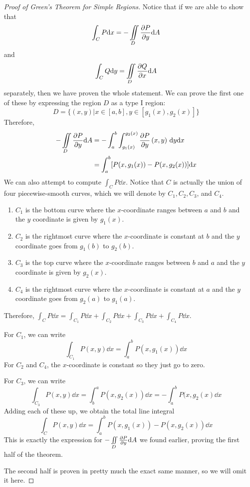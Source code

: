 \begin{proof}[Proof of Green's Theorem for Simple Regions]
    Notice that if we are able to show that
    \[ \int_C P \dd x = -\iint\limits_D \pdv{P}{y}\dd A\]
    and 
    \[ \int_C Q\dd y = \iint\limits_D \pdv{Q}{x}\dd A\]
    separately, then we have proven the whole statement. We can prove the first one of these by expressing the region $D$ as a type I region:
    \[ D = \{(x,y)|x\in[a,b], y\in[g_1(x),g_2(x)]\}\]
    Therefore,
    \begin{align*}
        -\iint\limits_D \pdv{P}{y}\dd A &= -\int_a^b\int_{g_1(x)}^{g_2(x)}\pdv{P}{y}\left(x,y\right)\,\dd y\dd x \\
        &= \int_a^b [P(x, g_1(x)) - P(x, g_2(x))]\dd x
    \end{align*}
    We can also attempt to compute $\int_CP\dd x$. Notice that $C$ is actually the union of four piecewise-smooth curves, which we will denote by $C_1, C_2, C_3$, and $C_4$.
    \begin{enumerate}
        \item $C_1$ is the bottom curve where the $x$-coordinate ranges between $a$ and $b$ and the $y$ coordinate is given by $g_1(x)$. 
        \item $C_2$ is the rightmost curve where the $x$-coordinate is constant at $b$ and the $y$ coordinate goes from $g_1(b)$ to $g_2(b)$.
        \item $C_3$ is the top curve where the $x$-coordinate ranges between $b$ and $a$ and the $y$ coordinate is given by $g_2(x)$.
        \item $C_4$ is the rightmost curve where the $x$-coordinate is constant at $a$ and the $y$ coordinate goes from $g_2(a)$ to $g_1(a)$.
     \end{enumerate}
     Therefore, $\int_C P\dd x = \int_{C_1}P\dd x+ \int_{C_2}P\dd x+ \int_{C_3}P\dd x+ \int_{C_4}P\dd x$. \par
     For $C_1$, we can write
     \[ \int_{C_1}P(x,y)\dd x = \int_a^b P(x,g_1(x))\dd x\]
     For $C_2$ and $C_4$, the $x$-coordinate is constant so they just go to zero. \par
     For $C_3$, we can write
     \[ \int_{C_3}P(x,y)\dd x = \int_b^a P(x, g_2(x))\dd x = -\int_a^bP(x,g_2(x)\dd x\]
     Adding each of these up, we obtain the total line integral
     \[ \int_C P(x,y)\dd x = \int_a^b P(x,g_1(x)) - P(x, g_2(x))\dd x\]
     This is exactly the expression for $-\iint\limits_D \pdv{P}{y}\dd A$ we found earlier, proving the first half of the theorem. \par
     The second half is proven in pretty much the exact same manner, so we will omit it here.
\end{proof}
